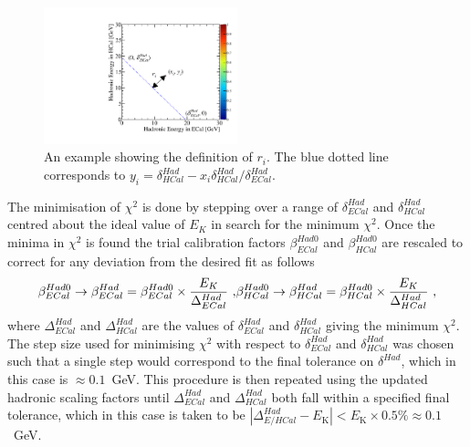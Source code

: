 %
\begin{figure}[h!]
\includegraphics[width=0.5\textwidth]{EnergyEstimators/Plots/Calibration/HadScaleSetting/HadScaleECalHCalSelectionExample.pdf}
\caption[An example showing the definition of $r_{i}$.  The blue dotted line corresponds to $y_{i} = \delta^{Had}_{HCal} - x_{i} \delta^{Had}_{HCal} / \delta^{Had}_{ECal}$.]{An example showing the definition of $r_{i}$.  The blue dotted line corresponds to $y_{i} = \delta^{Had}_{HCal} - x_{i} \delta^{Had}_{HCal} / \delta^{Had}_{ECal}$.}
\label{fig:hadscalechi2calc}
\end{figure}
%
\noindent The minimisation of $\chi^{2}$ is done by stepping over a range of $\delta^{Had}_{ECal}$ and $\delta^{Had}_{HCal}$ centred about the ideal value of $E_{K}$ in search for the minimum $\chi^{2}$.  Once the minima in $\chi^{2}$ is found the trial calibration factors $\beta^{Had0}_{ECal}$ and $\beta^{Had0}_{HCal}$ are rescaled to correct for any deviation from the desired fit as follows
%
\begin{equation}
\beta^{Had0}_{ECal} \rightarrow \beta^{Had}_{ECal} = \beta^{Had0}_{ECal} \times \frac{E_{K}}{\Delta^{Had}_{ECal}} \text{ ,}\\
\beta^{Had0}_{HCal} \rightarrow \beta^{Had}_{HCal} = \beta^{Had0}_{HCal} \times \frac{E_{K}}{\Delta^{Had}_{HCal}}\text{ ,}
\end{equation}
%
\noindent where $\Delta^{Had}_{ECal}$ and $\Delta^{Had}_{HCal}$ are the values of $\delta^{Had}_{ECal}$ and $\delta^{Had}_{HCal}$ giving the minimum $\chi^{2}$.  The step size used for minimising $\chi^{2}$ with respect to $\delta^{Had}_{ECal}$ and $\delta^{Had}_{HCal}$ was chosen such that a single step would correspond to the final tolerance on $\delta^{Had}$, which in this case is $\approx0.1$~GeV.  This procedure is then repeated using the updated hadronic scaling factors until $\Delta^{Had}_{ECal}$ and $\Delta^{Had}_{HCal}$ both fall within a specified final tolerance, which in this case is taken to be $|\Delta^{Had}_{E/HCal} - E_{\text{{K}}}| < E_{\text{{K}}} \times 0.5 \% \approx 0.1$~GeV.

